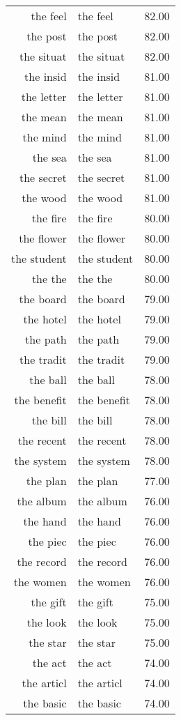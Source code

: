 \begin{table}[ht]
\begin{tabular}{rlr}
  the feel & the feel & 82.00 \\ 
  the post & the post & 82.00 \\ 
  the situat & the situat & 82.00 \\ 
  the insid & the insid & 81.00 \\ 
  the letter & the letter & 81.00 \\ 
  the mean & the mean & 81.00 \\ 
  the mind & the mind & 81.00 \\ 
  the sea & the sea & 81.00 \\ 
  the secret & the secret & 81.00 \\ 
  the wood & the wood & 81.00 \\ 
  the fire & the fire & 80.00 \\ 
  the flower & the flower & 80.00 \\ 
  the student & the student & 80.00 \\ 
  the the & the the & 80.00 \\ 
  the board & the board & 79.00 \\ 
  the hotel & the hotel & 79.00 \\ 
  the path & the path & 79.00 \\ 
  the tradit & the tradit & 79.00 \\ 
  the ball & the ball & 78.00 \\ 
  the benefit & the benefit & 78.00 \\ 
  the bill & the bill & 78.00 \\ 
  the recent & the recent & 78.00 \\ 
  the system & the system & 78.00 \\ 
  the plan & the plan & 77.00 \\ 
  the album & the album & 76.00 \\ 
  the hand & the hand & 76.00 \\ 
  the piec & the piec & 76.00 \\ 
  the record & the record & 76.00 \\ 
  the women & the women & 76.00 \\ 
  the gift & the gift & 75.00 \\ 
  the look & the look & 75.00 \\ 
  the star & the star & 75.00 \\ 
  the act & the act & 74.00 \\ 
  the articl & the articl & 74.00 \\ 
  the basic & the basic & 74.00 \\ 

\end{tabular}
\end{table}
